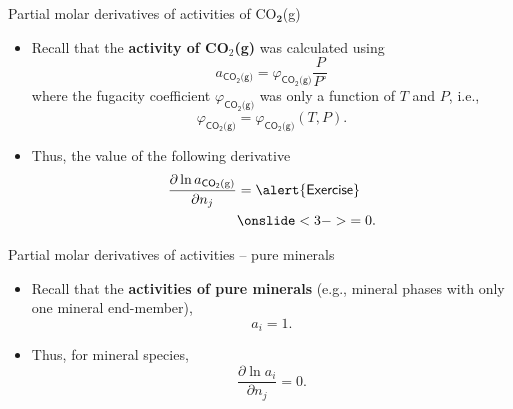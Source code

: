 \begin{frame}{Partial molar derivatives of activities of CO$_{\boldsymbol{2}}$(g)}

\vskip 10pt
\begin{itemize}
\item Recall that the {\bf activity of CO$_{2}$(g)} was calculated using
%
\[
a_{\mathsf{CO_{2}\text{(g)}}}=\varphi_{\mathsf{CO_{2}\text{(g)}}}\frac{P}{P^{\circ}}
\]
%
where the fugacity coefficient $\varphi_{\mathsf{CO_{2}\text{(g)}}}$
was only a function of $T$ and $P$, i.e., 
\[
\varphi_{\mathsf{CO_{2}\text{(g)}}}=\varphi_{\mathsf{CO_{2}\text{(g)}}}(T,P).
\]
\end{itemize}
\begin{itemize}
\hiddenpause
\item Thus, the value of the following derivative
%
\begin{alignat*}{2}
\frac{\partial\ln a_{\mathsf{CO_{2}\text{(g)}}}}{\partial n_{j}} & =\mathsf{\alert{Exercise}} \\
&\onslide<3->{ = 0.}
\end{alignat*}
\end{itemize}
\end{frame}
%
%
\begin{frame}{Partial molar derivatives of activities -- pure minerals}
\begin{itemize}
\item Recall that the {\bf activities of pure minerals} 
(e.g., mineral phases with only one mineral end-member),
\[
a_{i}=1.
\]
\item Thus, for mineral species, 
\[
\frac{\partial\ln a_{i}}{\partial n_{j}}=0.
\]
\end{itemize}
\end{frame}
%
%
